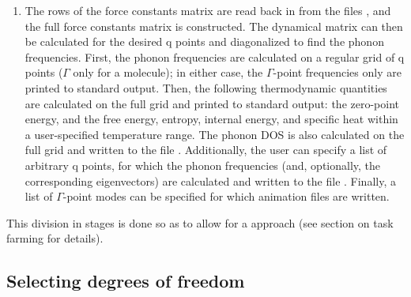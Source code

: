 \documentclass[letterpaper,10pt,english]{sphinxmanual}
\begin{document}
\begin{enumerate}
\item {} 
The rows of the force constants matrix are read back in from the
files , and the full force constants
matrix is constructed. The dynamical matrix can then be calculated
for the desired q points and diagonalized to find the phonon
frequencies. First, the phonon frequencies are calculated on a
regular grid of q points (\(\Gamma\) only for a molecule); in
either case, the \(\Gamma\)-point frequencies only are printed to
standard output. Then, the following thermodynamic quantities are
calculated on the full grid and printed to standard output: the
zero-point energy, and the free energy, entropy, internal energy, and
specific heat within a user-specified temperature range. The phonon
DOS is also calculated on the full grid and written to the file
. Additionally, the user can specify a list of
arbitrary q points, for which the phonon frequencies (and,
optionally, the corresponding eigenvectors) are calculated and
written to the file . Finally, a list of
\(\Gamma\)-point modes  can be specified for which
animation files  are written.

\end{enumerate}

This division in stages is done so as to allow for a 
approach (see section on task farming for details).


\subsection{Selecting degrees of freedom}
\label{\detokenize{phonons:selecting-degrees-of-freedom}}
\end{document}
